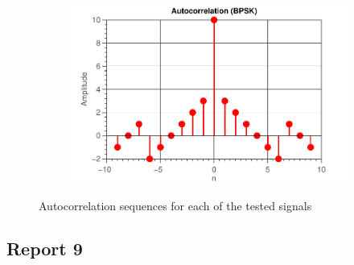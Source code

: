 \documentclass[11pt,titlepage]{report}
\begin{document}
\begin{figure}[H]
\begin{subfigure}{0.49\textwidth}
	\end{subfigure}
	\begin{subfigure}{0.49\textwidth}
		\includegraphics[width=\textwidth]{../../deliverable-7-resources/figures/ass-1/report-8-9-10/report-8/ass-1-report-8-BPSK-BPSK.pdf}
	\end{subfigure}
	\caption{Autocorrelation sequences for each of the tested signals}
	\label{fig:rep8-autocor}
\end{figure}
 

\subsection{Report 9}
\end{document}
